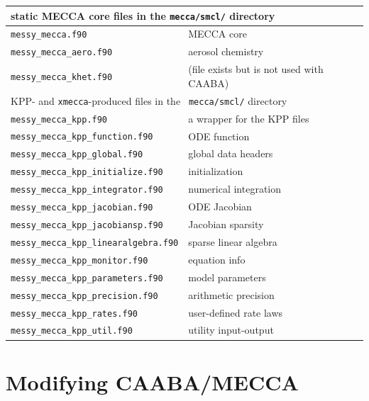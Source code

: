 \documentclass[twoside]{article}
\begin{document}
\begin{table}
\begin{center}
\begin{tabular}{lp{}}
      \hline
      \multicolumn{2}{l}{static MECCA core files in the {\tt mecca/smcl/}
        directory}\\
      \hline
      \verb|messy_mecca.f90|                   & MECCA core\\
      \verb|messy_mecca_aero.f90|              & aerosol chemistry\\
      \verb|messy_mecca_khet.f90|              & (file exists but is not
                                                 used with CAABA)\\
      \hline
      \multicolumn{2}{l}{KPP- and {\tt xmecca}-produced files in the {\tt
          mecca/smcl/} directory}\\
      \hline
      \verb|messy_mecca_kpp.f90|               & a wrapper for the KPP files\\
      \verb|messy_mecca_kpp_function.f90|      & ODE function\\
      \verb|messy_mecca_kpp_global.f90|        & global data headers\\
      \verb|messy_mecca_kpp_initialize.f90|    & initialization\\
      \verb|messy_mecca_kpp_integrator.f90|    & numerical integration\\
      \verb|messy_mecca_kpp_jacobian.f90|      & ODE Jacobian\\
      \verb|messy_mecca_kpp_jacobiansp.f90|    & Jacobian sparsity\\
      \verb|messy_mecca_kpp_linearalgebra.f90| & sparse linear algebra\\
      \verb|messy_mecca_kpp_monitor.f90|       & equation info\\
      \verb|messy_mecca_kpp_parameters.f90|    & model parameters\\
      \verb|messy_mecca_kpp_precision.f90|     & arithmetic precision\\
      \verb|messy_mecca_kpp_rates.f90|         & user-defined rate laws\\
      \verb|messy_mecca_kpp_util.f90|          & utility input-output\\
      \hline
    \end{tabular}
  \end{center}
\end{table}

\section{Modifying CAABA/MECCA}
\label{sec:modifying}
\end{document}
